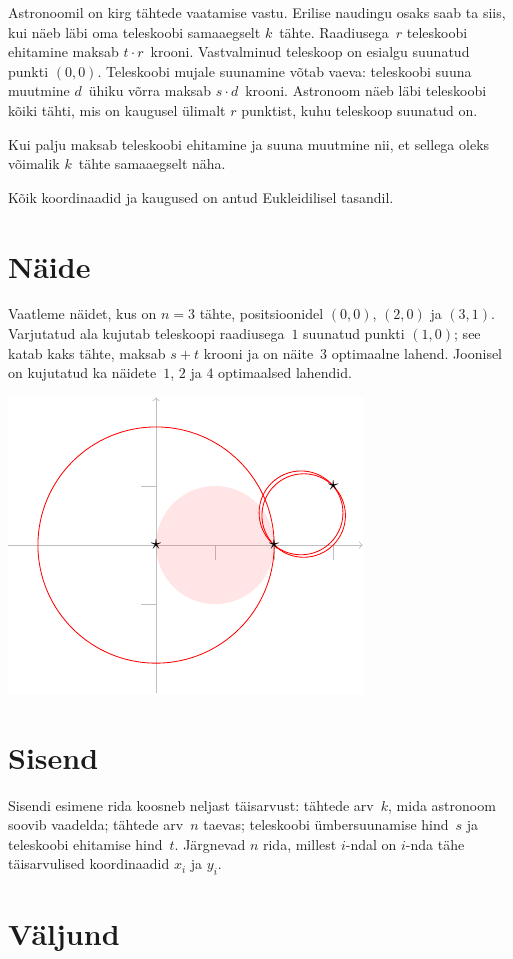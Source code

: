 
\noindent
Astronoomil on kirg tähtede vaatamise vastu.
Erilise naudingu osaks saab ta siis, kui näeb läbi oma teleskoobi samaaegselt $k$~tähte.
Raadiusega~$r$ teleskoobi ehitamine maksab $t\cdot r$~krooni.
Vastvalminud teleskoop on esialgu suunatud punkti $(0,0)$.
Teleskoobi mujale suunamine võtab vaeva:
teleskoobi suuna muutmine $d$~ühiku võrra maksab $s\cdot d$~krooni.
Astronoom näeb läbi teleskoobi kõiki tähti, mis on kaugusel ülimalt $r$ punktist, kuhu
teleskoop suunatud on.

Kui palju maksab teleskoobi ehitamine ja suuna muutmine nii, et sellega oleks võimalik
$k$~tähte samaaegselt näha.

\medskip

Kõik koordinaadid ja kaugused on antud Eukleidilisel tasandil.


\section*{Näide}

Vaatleme näidet, kus on $n=3$ tähte, positsioonidel $(0,0)$, $(2,0)$ ja $(3,1)$.
Varjutatud ala kujutab teleskoopi raadiusega~$1$ suunatud punkti $(1,0)$; see katab
kaks tähte, maksab $s + t$ krooni ja on näite~$3$ optimaalne lahend.
Joonisel on kujutatud ka näidete~$1$, $2$ ja $4$ optimaalsed lahendid.

\medskip
\noindent
\includegraphics[width=.3\textwidth]{img/samples.pdf}


\section*{Sisend}

Sisendi esimene rida koosneb neljast täisarvust:
tähtede arv~$k$, mida astronoom soovib vaadelda;
tähtede arv~$n$ taevas;
teleskoobi ümbersuunamise hind~$s$ ja
teleskoobi ehitamise hind~$t$.
Järgnevad $n$ rida, millest $i$-ndal on $i$-nda tähe
täisarvulised koordinaadid $x_i$ ja $y_i$.

\section*{Väljund}


